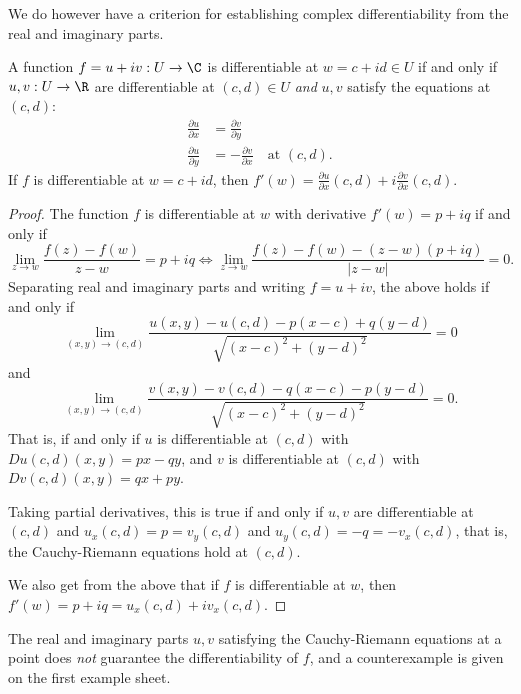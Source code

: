 We do however have a criterion for establishing complex differentiability from the real and imaginary parts.

\begin{theorem}
    A function $f = u + iv: U \rightarrow \C$ is differentiable at $w = c + id \in U$ if and only if $u, v : U \rightarrow \R$ are differentiable at $(c, d) \in U$ \emph{and} $u, v$ satisfy the  equations at $(c, d)$:
    \begin{align*}
        \frac{\partial u}{\partial x} &= \frac{\partial v}{\partial y} \\
        \frac{\partial u}{\partial y} &= - \frac{\partial v}{\partial x} \quad \text{at }(c, d).
    \end{align*}
    If $f$ is differentiable at $w = c + id$, then $f'(w) = \frac{\partial u}{\partial x}(c, d) + i \frac{\partial v}{\partial x} (c, d)$.
\end{theorem}
\begin{proof}
    The function $f$ is differentiable at $w$ with derivative $f'(w) = p + iq$ if and only if
    $$
    \lim _{z \rightarrow w} \frac{f(z)-f(w)}{z-w}=p+i q \iff \lim _{z \rightarrow w} \frac{f(z)-f(w)-(z-w)(p+i q)}{|z-w|}=0.
    $$
    Separating real and imaginary parts and writing $f = u + iv$, the above holds if and only if
    $$
    \lim _{(x, y) \rightarrow(c, d)} \frac{u(x, y)-u(c, d)-p(x-c)+q(y-d)}{\sqrt{(x-c)^{2}+(y-d)^{2}}}=0
    $$
    and
    $$
    \lim _{(x, y) \rightarrow(c, d)} \frac{v(x, y)-v(c, d)-q(x-c)-p(y-d)}{\sqrt{(x-c)^{2}+(y-d)^{2}}}=0.
    $$
    That is, if and only if $u$ is differentiable at $(c, d)$ with $Du(c, d)(x, y) = px - qy$, and $v$ is differentiable at $(c, d)$ with $Dv(c, d)(x, y) = qx + py$. 

    Taking partial derivatives, this is true if and only if $u, v$ are differentiable at $(c, d)$ and $u_x(c, d) = p = v_y(c, d)$ and $u_y(c, d) = -q = -v_x(c, d)$, that is, the Cauchy-Riemann equations hold at $(c, d)$.

    We also get from the above that if $f$ is differentiable at $w$, then $f'(w) = p + iq = u_x(c, d) + i v_x(c, d)$.
\end{proof}

\begin{remark}[Warning]
    The real and imaginary parts
    $u, v$ satisfying the Cauchy-Riemann equations at a point does \emph{not} guarantee the differentiability of $f$, and a counterexample is given on the first example sheet.
\end{remark}

